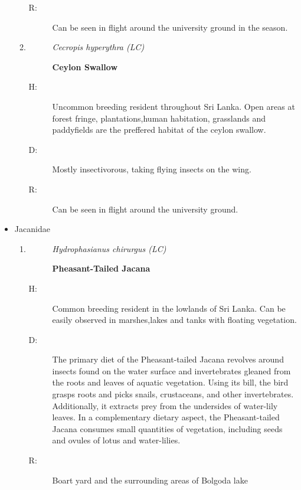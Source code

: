 \begin{itemize}
\begin{enumerate}
\begin{description}
\item[R: ]%
Can be seen in flight around the university ground in the season.%
\end{description}%
\item%
\begin{description}%
\item[]%
\textit{Cecropis hyperythra (LC)}%
\item[]%
\textbf{Ceylon Swallow}%
\end{description}%
\begin{description}%
\item[H: ]%
Uncommon breeding resident throughout Sri Lanka. Open areas at forest fringe, plantations,human habitation, grasslands and paddyfields are the preffered habitat of the ceylon swallow.%
\item[D: ]%
Mostly insectivorous, taking flying insects on the wing.%
\item[R: ]%
Can be seen in flight around the university ground.%
\end{description}%
\end{enumerate}%
\item%
Jacanidae%
\begin{enumerate}%
\item%
\begin{description}%
\item[]%
\textit{Hydrophasianus chirurgus (LC)}%
\item[]%
\textbf{Pheasant{-}Tailed Jacana}%
\end{description}%
\begin{description}%
\item[H: ]%
Common breeding resident in the lowlands of Sri Lanka. Can be easily observed in marshes,lakes and tanks with floating vegetation.%
\item[D: ]%
The primary diet of the Pheasant{-}tailed Jacana revolves around insects found on the water surface and invertebrates gleaned from the roots and leaves of aquatic vegetation. Using its bill, the bird grasps roots and picks snails, crustaceans, and other invertebrates. Additionally, it extracts prey from the undersides of water{-}lily leaves. In a complementary dietary aspect, the Pheasant{-}tailed Jacana consumes small quantities of vegetation, including seeds and ovules of lotus and water{-}lilies.%
\item[R: ]%
Boart yard and the surrounding areas of Bolgoda lake%
\end{description}%
\end{enumerate}%

\end{itemize}
